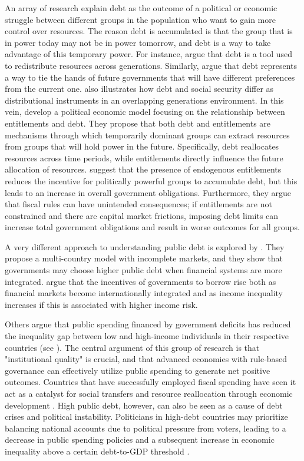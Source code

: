 \documentclass[12pt, titlepage]{article}
\numberwithin{equation}{section}
\begin{document}
	An array of research explain debt as the outcome of a political or economic struggle between different groups in the
	population who want to gain more control over resources. The reason debt is accumulated
	is that the group that is in power today may not be in power tomorrow, and debt is a way
	to take advantage of this temporary power. For instance, \cite{Song2012} argue that debt is a tool used to redistribute resources across generations.  Similarly, \cite{Alesina1990} argue that debt represents a way to tie the hands of future governments that will have different preferences from the current one. \cite{Tabellini1991} also illustrates how debt and social security differ as distributional instruments in an overlapping generations environment. In this vein, \cite{Bouton2020} develop a political economic model focusing on the relationship between entitlements and debt. They propose that both debt and entitlements are mechanisms through which temporarily dominant groups can extract resources from groups that will hold power in the future. Specifically, debt reallocates resources across time periods, while entitlements directly influence the future allocation of resources. \cite{Debrun2020} suggest that the presence of endogenous entitlements reduces the incentive for politically powerful groups to accumulate debt, but this leads to an increase in overall government obligations. Furthermore, they argue that fiscal rules can have unintended consequences; if entitlements are not constrained and there are capital market frictions, imposing debt limits can increase total government obligations and result in worse outcomes for all groups.

	A very different approach to understanding public debt is explored by \cite{Azzimonti2014}. They propose a multi-country model with incomplete markets, and they show that governments may choose higher public debt when financial systems are more integrated. \cite{Azzimonti2014} argue that the incentives of governments to borrow rise both as financial markets become internationally integrated and as income inequality increases if this is associated with higher income risk.

	Others argue that public spending financed by government deficits has reduced the inequality gap between low and high-income individuals in their respective countries (see \cite{BastagliCoadyGupta2015, ClementsDeMooijiGuptaKeen2015, SalottiTrecroci2018}). The central argument of this group of research is that "institutional quality" is crucial, and that advanced economies with rule-based governance can effectively utilize public spending to generate net positive outcomes. Countries that have successfully employed fiscal spending have seen it act as a catalyst for social transfers and resource reallocation through economic development \citep{OrtizOspina2016}. High public debt, however, can also be seen as a cause of debt crises and political instability. Politicians in high-debt countries may prioritize balancing national accounts due to political pressure from voters, leading to a decrease in public spending policies and a subsequent increase in economic inequality above a certain debt-to-GDP threshold \citep{Reinhart2011}.
\end{document}
